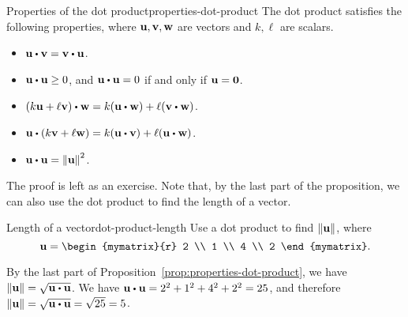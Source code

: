 \begin{proposition}{Properties of the dot product}{properties-dot-product}
  The dot product satisfies the following properties, where
  $\vect{u},\vect{v},\vect{w}$ are vectors and $k,\ell$ are
  scalars.
  \begin{itemize}
  \item $\vect{u}\dotprod\vect{v}=\vect{v}\dotprod\vect{u}$.
  \item $\vect{u}\dotprod\vect{u}\geq 0$, and $\vect{u}\dotprod\vect{u}=0$ if and only if $\vect{u}=\vect{0}$.
  \item $(k\vect{u}+\ell\vect{v})\dotprod\vect{w}=k(\vect{u}\dotprod\vect{w})+\ell(\vect{v}\dotprod\vect{w})$.
  \item $\vect{u}\dotprod(k\vect{v}+\ell\vect{w})
    =k(\vect{u}\dotprod \vect{v})+\ell(\vect{u}\dotprod\vect{w})$.
  \item $\vect{u}\dotprod\vect{u}=\norm{\vect{u}}^2$.
  \end{itemize}
\end{proposition}

The proof is left as an exercise. Note that, by the last part of the
proposition, we can also use the dot product to find the length of a
vector.

\begin{example}{Length of a vector}{dot-product-length}
  Use a dot product to find $\norm{\vect{u}}$, where
  \begin{equation*}
    \vect{u}
    =
    \begin{mymatrix}{r}
      2 \\
      1 \\
      4 \\
      2
    \end{mymatrix}.
  \end{equation*}
\end{example}

\begin{solution}
  By the last part of Proposition~\ref{prop:properties-dot-product}, we have
  $\norm{\vect{u}} = \sqrt {\vect{u} \dotprod \vect{u}}$. We have
  $\vect{u} \dotprod \vect{u} = 2^2+1^2+4^2+2^2 = 25$, and therefore
  $\norm{\vect{u}} = \sqrt{\vect{u} \dotprod \vect{u}} = \sqrt{25} = 5$.
\end{solution}
